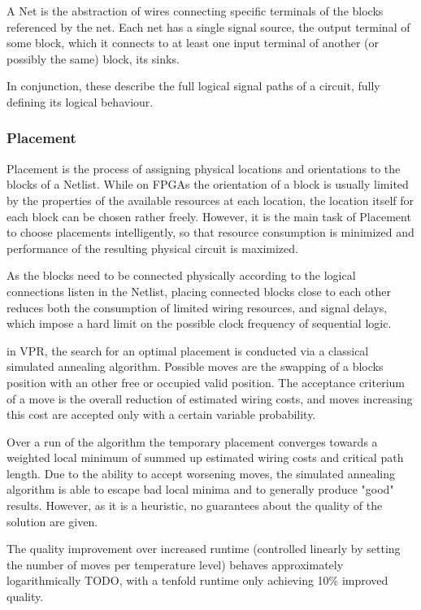 A Net is the abstraction of wires connecting specific terminals of the blocks referenced by the net. Each net has a single signal source, the output terminal of some block, which it connects to at least one input terminal of another (or possibly the same) block, its sinks.

In conjunction, these describe the full logical signal paths of a circuit, fully defining its logical behaviour.

\subsubsection{Placement}

Placement is the process of assigning physical locations and orientations to the blocks of a Netlist. While on \glspl{FPGA} the orientation of a block is usually limited by the properties of the available resources at each location, the location itself for each block can be chosen rather freely. However, it is the main task of Placement to choose placements intelligently, so that resource consumption is minimized and performance of the resulting physical circuit is maximized.

As the blocks need to be connected physically according to the logical connections listen in the Netlist, placing connected blocks close to each other reduces both the consumption of limited wiring resources, and signal delays, which impose a hard limit on the possible clock frequency of sequential logic.

in \gls{VPR}, the search for an optimal placement is conducted via a classical simulated annealing algorithm. Possible moves are the swapping of a blocks position with an other free or occupied valid position. The acceptance criterium of a move is the overall reduction of estimated wiring costs, and moves increasing this cost are accepted only with a certain variable probability.

Over a run of the algorithm the temporary placement converges towards a weighted local minimum of summed up estimated wiring costs and critical path length. Due to the ability to accept worsening moves, the simulated annealing algorithm is able to escape bad local minima and to generally produce "good" results. However, as it is a heuristic, no guarantees about the quality of the solution are given.

The quality improvement over increased runtime (controlled linearly by setting the number of moves per temperature level) behaves approximately logarithmically TODO, with a tenfold runtime only achieving 10\% improved quality.\cite{TODO}

